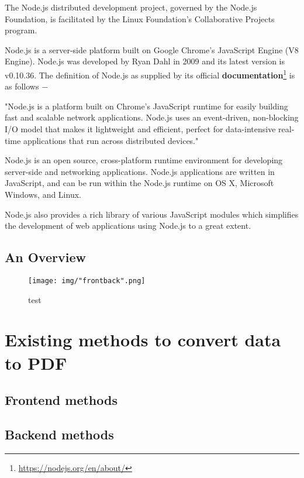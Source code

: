 \documentclass[paper.tex]{subfiles}
\begin{document}
\begin{enumerate}[a.]
  The Node.js distributed development project, governed by the Node.js Foundation, is facilitated by the Linux Foundation's Collaborative Projects program.

  Node.js is a server-side platform built on Google Chrome's JavaScript Engine (V8 Engine). Node.js was developed by Ryan Dahl in 2009 and its latest version is v0.10.36. The definition of Node.js as supplied by its official \textbf{documentation}\footnote{\url{https://nodejs.org/en/about/}} is as follows −

  "Node.js is a platform built on Chrome's JavaScript runtime for easily building fast and scalable network applications. Node.js uses an event-driven, non-blocking I/O model that makes it lightweight and efficient, perfect for data-intensive real-time applications that run across distributed devices."

  Node.js is an open source, cross-platform runtime environment for developing server-side and networking applications. Node.js applications are written in JavaScript, and can be run within the Node.js runtime on OS X, Microsoft Windows, and Linux.

  Node.js also provides a rich library of various JavaScript modules which simplifies the development of web applications using Node.js to a great extent.
\end{enumerate}

\newpage
\subsection{An Overview}

\begin{figure}[H]
\centering
\texttt{[image: img/"frontback".png]}
\caption{test}
\end{figure}

\section{Existing methods to convert data to PDF}
\subsection{Frontend methods}
\subsection{Backend methods}
\end{document}
